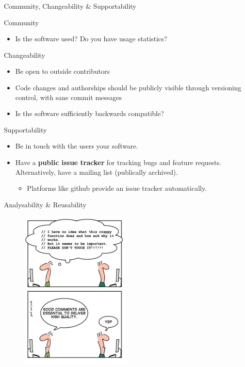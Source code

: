 \documentclass[compress]{beamer}
\begin{document}
\begin{frame}{Community, Changeability \& Supportability}
    \begin{block}{Community}
        \begin{itemize}
            \item Is the software used? Do you have usage statistics?
        \end{itemize}
    \end{block}
    \begin{block}{Changeability}
        \begin{itemize}
            \item Be open to outside contributors
            \item Code changes and authorships should be publicly visible through versioning control, with sane commit messages
            \item Is the software sufficiently backwards compatible?
        \end{itemize}
    \end{block}

    \begin{block}{Supportability}
        \begin{itemize}
            \item Be in touch with the users your software.
            \item Have a \textbf{public issue tracker} for tracking bugs and
                feature requests. Alternatively, have a mailing list
                (publically archived).
            \begin{itemize}
                \item Platforms like github provide an issue tracker automatically.
            \end{itemize}
        \end{itemize}
    \end{block}
\end{frame}

\begin{frame}{Analysability \& Reusability}
\begin{figure}
\includegraphics[height=8cm]{img/comments.jpg}
\end{figure}
\end{frame}
\end{document}
